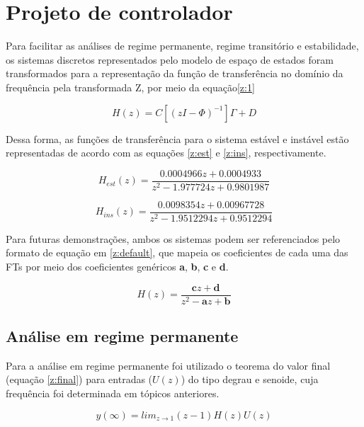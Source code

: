 \section{Projeto de controlador}

Para facilitar as análises de regime permanente, regime transitório e estabilidade, os sistemas discretos representados pelo modelo de espaço de estados foram transformados para a representação da função de transferência no domínio da frequência pela transformada Z, por meio da equação\ref{z:1}

\begin{equation} \label{z:1}
    H(z) = C[(zI-\Phi)^{-1}]\Gamma + D
\end{equation}

Dessa forma, as funções de transferência para o sistema estável e instável estão representadas de acordo com as equações \ref{z:est} e \ref{z:ins}, respectivamente.

\begin{equation} \label{z:est}
    H_{est}(z) = \frac{0.0004966 z + 0.0004933}{z^2 - 1.977724 z + 0.9801987}
\end{equation}

\begin{equation} \label{z:ins}
    H_{ins}(z) = \frac{0.0098354 z + 0.00967728}{z^2 - 1.9512294 z + 0.9512294}
\end{equation}

Para futuras demonstrações, ambos os sistemas podem ser referenciados pelo formato de equação em \ref{z:default}, que mapeia os coeficientes de cada uma das FTs por meio dos coeficientes genéricos \textbf{a}, \textbf{b}, \textbf{c} e \textbf{d}.

\begin{equation} \label{z:default}
    H(z) = \frac{\textbf{c}z + \textbf{d}}{z^2 - \textbf{a} z + \textbf{b}}
\end{equation}


\subsection{Análise em regime permanente}

Para a análise em regime permanente foi utilizado o teorema do valor final (equação \ref{z:final}) para entradas ($U(z)$) do tipo degrau e senoide, cuja frequência foi determinada em tópicos anteriores.

\begin{equation} \label{z:final}
    y(\infty) = lim_{z \to 1} (z-1)H(z)U(z)
\end{equation}

